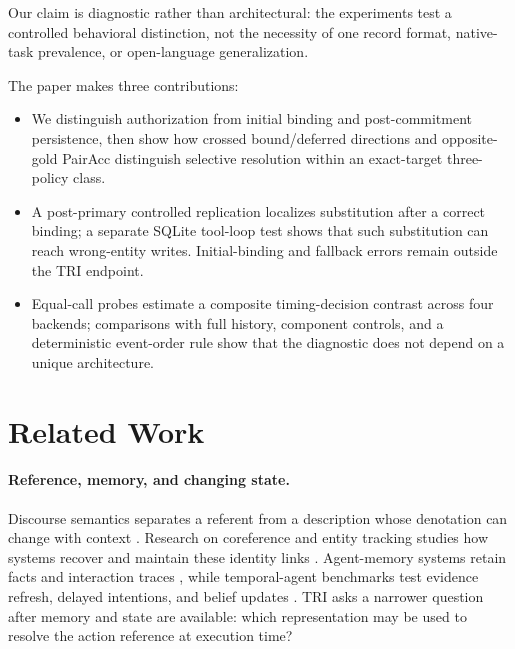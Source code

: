 \documentclass[letterpaper]{article}
\begin{document}
Our claim is diagnostic rather than architectural: the experiments test a controlled behavioral
distinction, not the necessity of one record format, native-task prevalence, or open-language
generalization.

The paper makes three contributions:
\nopagebreak[4]
\begin{itemize}
    \item We distinguish authorization from initial binding and post-commitment persistence, then
    show how crossed bound/deferred directions and opposite-gold PairAcc distinguish selective
    resolution within an exact-target three-policy class.
    \item A post-primary controlled replication localizes substitution after a correct binding; a
    separate SQLite tool-loop test shows that such substitution can reach wrong-entity writes.
    Initial-binding and fallback errors remain outside the TRI endpoint.
    \item Equal-call probes estimate a composite timing-decision contrast across four
    backends; comparisons with full history, component controls, and a deterministic event-order
    rule show that the diagnostic does not depend on a unique architecture.
\end{itemize}

\section{Related Work}

\paragraph{Reference, memory, and changing state.}
Discourse semantics separates a referent from a description whose denotation can change with
context \cite{kamp1993discourse,grosz1995centering}. Research on coreference and entity tracking studies
how systems recover and maintain these identity links
\cite{lee2017coreference,joshi2020spanbert,tang2026entitytracking}. Agent-memory systems retain facts
and interaction traces \cite{packer2023memgpt,sumers2024coala}, while temporal-agent benchmarks test
evidence refresh, delayed intentions, and belief updates
\cite{cheng2026temporalblindness,liu2026pmbench,ji2026clawarena,xu2026evoarena}. TRI asks a narrower
question after memory and state are available: which representation may be used to resolve the
action reference at execution time?
\end{document}
